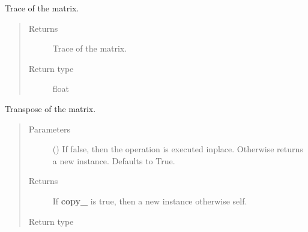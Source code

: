 \documentclass[letterpaper,10pt,english]{sphinxmanual}
\begin{document}
\begin{fulllineitems}
\begin{fulllineitems}
\label{\detokenize{qsim:qsim.matrix.OperatorMatrix.tr}}
Trace of the matrix.
\begin{quote}\begin{description}
\item[{Returns}] \leavevmode
{} \textendash{} Trace of the matrix.

\item[{Return type}] \leavevmode
float

\end{description}\end{quote}

\end{fulllineitems}


\begin{fulllineitems}
\label{\detokenize{qsim:qsim.matrix.OperatorMatrix.transpose}}
Transpose of the matrix.
\begin{quote}\begin{description}
\item[{Parameters}] \leavevmode
{} (\sphinxstyleliteralemphasis{\sphinxupquote{, }}) \textendash{} If false, then the operation is executed inplace. Otherwise returns
a new instance. Defaults to True.

\item[{Returns}] \leavevmode
{} \textendash{} If {\color{red}\bfseries{}copy\_} is true, then a new instance otherwise self.

\item[{Return type}] \leavevmode
{\hyperref[\detokenize{qsim:qsim.matrix.OperatorMatrix}]{}}

\end{description}\end{quote}


\end{fulllineitems}
\end{fulllineitems}
\end{document}
